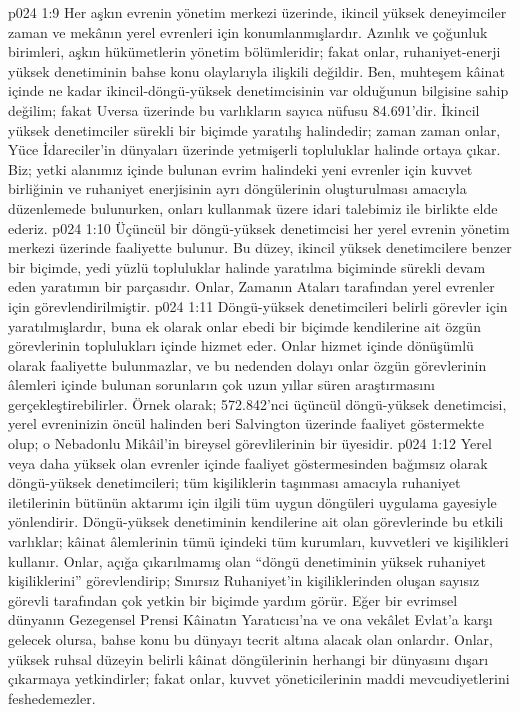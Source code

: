 \vs p024 1:9 Her aşkın evrenin yönetim merkezi üzerinde, ikincil yüksek deneyimciler zaman ve mekânın yerel evrenleri için konumlanmışlardır. Azınlık ve çoğunluk birimleri, aşkın hükümetlerin yönetim bölümleridir; fakat onlar, ruhaniyet\hyp{}enerji yüksek denetiminin bahse konu olaylarıyla ilişkili değildir. Ben, muhteşem kâinat içinde ne kadar ikincil\hyp{}döngü\hyp{}yüksek denetimcisinin var olduğunun bilgisine sahip değilim; fakat Uversa üzerinde bu varlıkların sayıca nüfusu 84.691’dir. İkincil yüksek denetimciler sürekli bir biçimde yaratılış halindedir; zaman zaman onlar, Yüce İdareciler’in dünyaları üzerinde yetmişerli topluluklar halinde ortaya çıkar. Biz; yetki alanımız içinde bulunan evrim halindeki yeni evrenler için kuvvet birliğinin ve ruhaniyet enerjisinin ayrı döngülerinin oluşturulması amacıyla düzenlemede bulunurken, onları kullanmak üzere idari talebimiz ile birlikte elde ederiz.
\vs p024 1:10 Üçüncül bir döngü\hyp{}yüksek denetimcisi her yerel evrenin yönetim merkezi üzerinde faaliyette bulunur. Bu düzey, ikincil yüksek denetimcilere benzer bir biçimde, yedi yüzlü topluluklar halinde yaratılma biçiminde sürekli devam eden yaratımın bir parçasıdır. Onlar, Zamanın Ataları tarafından yerel evrenler için görevlendirilmiştir.
\vs p024 1:11 Döngü\hyp{}yüksek denetimcileri belirli görevler için yaratılmışlardır, buna ek olarak onlar ebedi bir biçimde kendilerine ait özgün görevlerinin toplulukları içinde hizmet eder. Onlar hizmet içinde dönüşümlü olarak faaliyette bulunmazlar, ve bu nedenden dolayı onlar özgün görevlerinin âlemleri içinde bulunan sorunların çok uzun yıllar süren araştırmasını gerçekleştirebilirler. Örnek olarak; 572.842’nci üçüncül döngü\hyp{}yüksek denetimcisi, yerel evreninizin öncül halinden beri Salvington üzerinde faaliyet göstermekte olup; o Nebadonlu Mikâil’in bireysel görevlilerinin bir üyesidir.
\vs p024 1:12 Yerel veya daha yüksek olan evrenler içinde faaliyet göstermesinden bağımsız olarak döngü\hyp{}yüksek denetimcileri; tüm kişiliklerin taşınması amacıyla ruhaniyet iletilerinin bütünün aktarımı için ilgili tüm uygun döngüleri uygulama gayesiyle yönlendirir. Döngü\hyp{}yüksek denetiminin kendilerine ait olan görevlerinde bu etkili varlıklar; kâinat âlemlerinin tümü içindeki tüm kurumları, kuvvetleri ve kişilikleri kullanır. Onlar, açığa çıkarılmamış olan “döngü denetiminin yüksek ruhaniyet kişiliklerini” görevlendirip; Sınırsız Ruhaniyet’in kişiliklerinden oluşan sayısız görevli tarafından çok yetkin bir biçimde yardım görür. Eğer bir evrimsel dünyanın Gezegensel Prensi Kâinatın Yaratıcısı’na ve ona vekâlet Evlat’a karşı gelecek olursa, bahse konu bu dünyayı tecrit altına alacak olan onlardır. Onlar, yüksek ruhsal düzeyin belirli kâinat döngülerinin herhangi bir dünyasını dışarı çıkarmaya yetkindirler; fakat onlar, kuvvet yöneticilerinin maddi mevcudiyetlerini feshedemezler.
